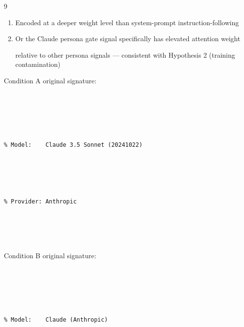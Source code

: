 \documentclass[11pt]{article}
\theoremstyle{definition}
\begin{document}
\begin{thebibliography}{9}
\begin{enumerate}





\item Encoded at a deeper weight level than system-prompt instruction-following





\item Or the Claude persona gate signal specifically has elevated attention weight





  relative to other persona signals --- consistent with Hypothesis 2 (training contamination)





\end{enumerate}











\noindent Condition A original signature:





\begin{lstlisting}[language={}]





% Model:    Claude 3.5 Sonnet (20241022)





% Provider: Anthropic





\end{lstlisting}











\noindent Condition B original signature:





\begin{lstlisting}[language={}]





% Model:    Claude (Anthropic)






\end{lstlisting}
\end{thebibliography}
\end{document}
